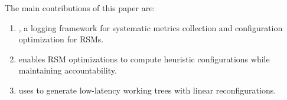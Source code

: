 The main contributions of this paper are:
\begin{enumerate}
  \item \sysname, a logging framework for systematic metrics collection and configuration optimization for RSMs.
  \item \sysname enables RSM optimizations to compute heuristic configurations while maintaining accountability.
  \item \optitree uses \sysname to generate low-latency working trees with linear reconfigurations.
\end{enumerate}
